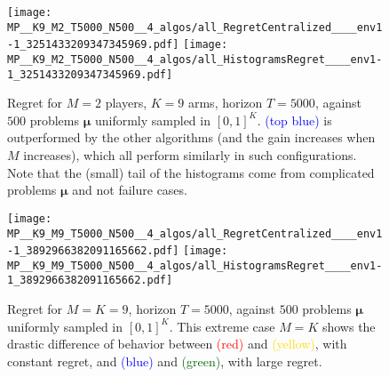 %
%

\begin{figure}[!t]
  \centering
      \texttt{[image: MP\_\_K9\_M2\_T5000\_N500\_\_4\_algos/all\_RegretCentralized\_\_\_\_env1-1\_3251433209347345969.pdf]}
  \vspace{15pt}%
      \texttt{[image: MP\_\_K9\_M2\_T5000\_N500\_\_4\_algos/all\_HistogramsRegret\_\_\_\_env1-1\_3251433209347345969.pdf]}
  \caption[Regret for $M=2$ players, $K=9$ arms, horizon $T=5000$, against $500$ problems $\boldsymbol{\mu}$ uniformly sampled.]{Regret for $M=2$ players, $K=9$ arms, horizon $T=5000$, against $500$ problems $\boldsymbol{\mu}$ uniformly sampled in $[0,1]^K$. \textcolor{blue}{\rhoRand{} (top blue)} is outperformed by the other algorithms (and the gain increases when $M$ increases), which all perform similarly in such configurations. Note that the (small) tail of the histograms come from complicated problems $\boldsymbol{\mu}$ and not failure cases.}
  \label{fig:5:MP__K9_M2_T5000_N500__4_algos__all_RegretCentralized__BayesianProblems}
\end{figure}


\begin{figure}[!t]
  \centering
      \texttt{[image: MP\_\_K9\_M9\_T5000\_N500\_\_4\_algos/all\_RegretCentralized\_\_\_\_env1-1\_3892966382091165662.pdf]}
  \vspace{20pt}%
      \texttt{[image: MP\_\_K9\_M9\_T5000\_N500\_\_4\_algos/all\_HistogramsRegret\_\_\_\_env1-1\_3892966382091165662.pdf]}
  \caption[Regret for $M=K=9$, horizon $T=5000$, against $500$ problems $\boldsymbol{\mu}$ uniformly sampled.]{Regret for $M=K=9$, horizon $T=5000$, against $500$ problems $\boldsymbol{\mu}$ uniformly sampled in $[0,1]^K$. This extreme case $M=K$ shows the drastic difference of behavior between \textcolor{red}{\RandTopM{} (red)} and \textcolor{gold}{\MCTopM{} (yellow)}, with constant regret, and \textcolor{blue}{\rhoRand{} (blue)} and \textcolor{darkgreen}{\Selfish{} (green)}, with large regret.}
  \label{fig:5:MP__K9_M9_T5000_N500__4_algos__all_HistogramsRegret}
\end{figure}


